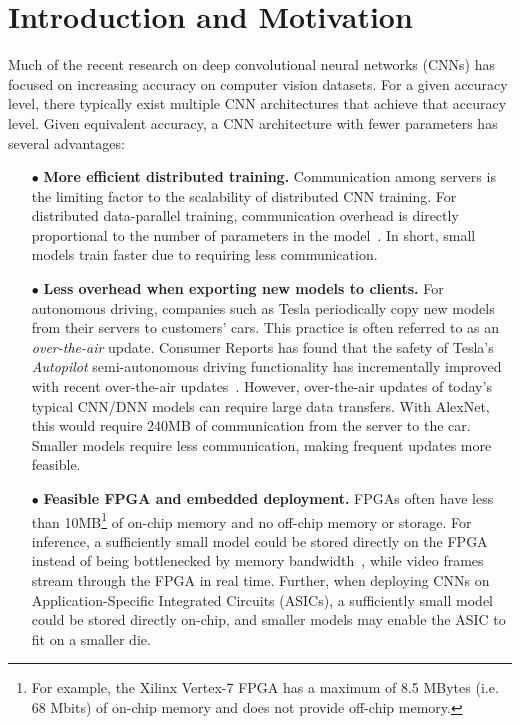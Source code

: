 \documentclass{article} \usepackage{iclr2017_conference,times}
\renewcommand{\cite}{\citep}
\def\vsp{\vspace{-0.15in}}
\begin{document}
\section{Introduction and Motivation}
\vsp
\label{sec:intro-ch5}
Much of the recent research on deep convolutional neural networks (CNNs) has focused on increasing accuracy on computer vision datasets.
For a given accuracy level, there typically exist multiple CNN architectures that achieve that accuracy level.
Given equivalent accuracy, a CNN architecture with fewer parameters has several advantages:
\begin{itemize}
	\setlength\itemsep{0in} \item[$\bullet$]{{\bf More efficient distributed training.} 
		Communication among servers is the limiting factor to the scalability of distributed CNN training.
		For distributed data-parallel training, communication overhead is directly proportional to the number of parameters in the model~\cite{FireCaffe}.
		In short, small models train faster due to requiring less communication.
	}
	
	\item[$\bullet$]{{\bf Less overhead when exporting new models to clients.} For autonomous driving, companies such as Tesla periodically copy new models from their servers to customers' cars. This practice is often referred to as an {\em over-the-air} update. Consumer Reports has found that the safety of Tesla's {\em Autopilot} semi-autonomous driving functionality has incrementally improved with recent over-the-air updates~\cite{ConsumerReports-Tesla}. However, over-the-air updates of today's typical CNN/DNN models can require large data transfers. With AlexNet, this would require 240MB of communication from the server to the car. Smaller models require less communication, making frequent updates more feasible.}
	
	\item[$\bullet$]{{\bf Feasible FPGA and embedded deployment.} FPGAs often have less than 10MB\footnote{For example, the Xilinx Vertex-7 FPGA has a maximum of 8.5 MBytes (i.e. 68 Mbits) of on-chip memory and does not provide off-chip memory.} of on-chip memory and no off-chip memory or storage. For inference, a sufficiently small model could be stored directly on the FPGA instead of being bottlenecked by memory bandwidth~\cite{fpga2016cnn}, while video frames stream through the FPGA in real time.
		Further, when deploying CNNs on Application-Specific Integrated Circuits (ASICs), a sufficiently small model could be stored directly on-chip, and smaller models may enable the ASIC to fit on a smaller die.}




\end{itemize}
\end{document}
